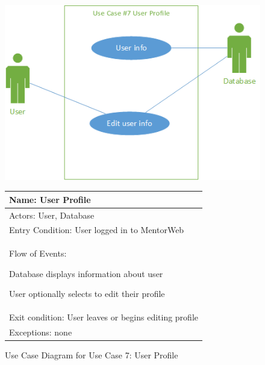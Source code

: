 \documentclass[11pt]{article}
\begin{document}
            \begin{figure}[H]
            \centering
            \includegraphics{UseCase7UserProfile}

				\begin{tabular}{|p{12 cm}|}
					\hline
					Name: User Profile
					\\ \hline
					Actors: User, Database
					\\ \hline
					Entry Condition: User logged in to MentorWeb
					\\ \hline
					Flow of Events:
					\begin{enumerate*}
						\item Database displays information about user
						\item User optionally selects to edit their profile
					\end{enumerate*} \\ \hline
					Exit condition: User leaves or begins editing profile
					\\ \hline
					Exceptions: none
					\\ \hline
				\end{tabular}

            \caption{Use Case Diagram for Use Case 7: User Profile}
            \label{UC7}
            \end{figure}
\end{document}
